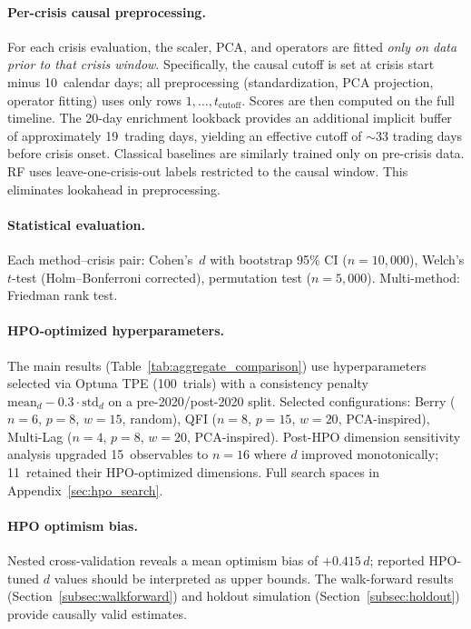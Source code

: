 \documentclass[3p]{elsarticle}
\begin{document}
\paragraph{Per-crisis causal preprocessing.}
For each crisis evaluation, the scaler, PCA, and operators are fitted
\emph{only on data prior to that crisis window}.  Specifically, the
causal cutoff is set at crisis start minus 10~calendar days; all
preprocessing (standardization, PCA projection, operator fitting) uses
only rows $1, \ldots, t_{\text{cutoff}}$.  Scores are then computed
on the full timeline.  The 20-day enrichment lookback provides an
additional implicit buffer of approximately 19~trading days, yielding
an effective cutoff of ${\sim}33$ trading days before crisis onset.  Classical baselines are similarly trained only
on pre-crisis data.  RF uses leave-one-crisis-out labels restricted to
the causal window.  This eliminates lookahead in preprocessing.

\paragraph{Statistical evaluation.}
Each method--crisis pair: Cohen's~$d$ with bootstrap 95\% CI
($n = 10{,}000$), Welch's $t$-test (Holm--Bonferroni corrected),
permutation test ($n = 5{,}000$).  Multi-method: Friedman rank test.

\paragraph{HPO-optimized hyperparameters.}
The main results (Table~\ref{tab:aggregate_comparison}) use
hyperparameters selected via Optuna TPE (100~trials) with a
consistency penalty
$\text{mean}_d - 0.3 \cdot \text{std}_d$ on a pre-2020/post-2020 split.
Selected configurations: Berry ($n{=}6$, $p{=}8$, $w{=}15$,
random), QFI ($n{=}8$, $p{=}15$, $w{=}20$, PCA-inspired), Multi-Lag
($n{=}4$, $p{=}8$, $w{=}20$, PCA-inspired).
Post-HPO dimension sensitivity analysis upgraded 15~observables to
$n = 16$ where $d$ improved monotonically; 11~retained their
HPO-optimized dimensions.  Full search spaces in
Appendix~\ref{sec:hpo_search}.

\paragraph{HPO optimism bias.}
Nested cross-validation reveals a mean optimism bias of $+0.415\,d$;
reported HPO-tuned $d$ values should be interpreted as upper bounds.
The walk-forward results (Section~\ref{subsec:walkforward})
and holdout simulation (Section~\ref{subsec:holdout}) provide
causally valid estimates.
\end{document}
